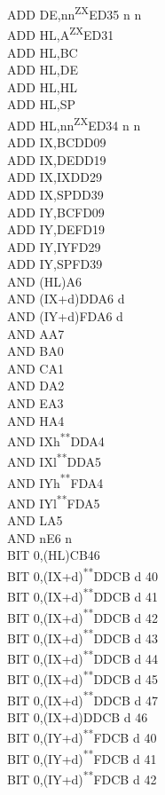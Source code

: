 \documentclass[twoside,openright,a4paper]{book}
\newcommand{\UNDOC}{\textnormal{\textsuperscript{**}}}
\newcommand{\ZXN}{\textnormal{\textsuperscript{ZX}}}
\begin{document}
\begin{multicols}{3}
{\begin{tabbing}
	ADD DE,nn\ZXN\>ED35 n n\\
	ADD HL,A\ZXN\>ED31\\
	ADD HL,BC\\
	ADD HL,DE\\
	ADD HL,HL\\
	ADD HL,SP\\
	ADD HL,nn\ZXN\>ED34 n n\\
	ADD IX,BC\>DD09\\
	ADD IX,DE\>DD19\\
	ADD IX,IX\>DD29\\
	ADD IX,SP\>DD39\\
	ADD IY,BC\>FD09\\
	ADD IY,DE\>FD19\\
	ADD IY,IY\>FD29\\
	ADD IY,SP\>FD39\\
	AND (HL)\>A6\\
	AND (IX+d)\>DDA6 d\\
	AND (IY+d)\>FDA6 d\\
	AND A\>A7\\
	AND B\>A0\\
	AND C\>A1\\
	AND D\>A2\\
	AND E\>A3\\
	AND H\>A4\\
	AND IXh\UNDOC\>DDA4\\
	AND IXl\UNDOC\>DDA5\\
	AND IYh\UNDOC\>FDA4\\
	AND IYl\UNDOC\>FDA5\\
	AND L\>A5\\
	AND n\>E6 n\\
	BIT 0,(HL)\>CB46\\
	BIT 0,(IX+d)\UNDOC\>DDCB d 40\\
	BIT 0,(IX+d)\UNDOC\>DDCB d 41\\
	BIT 0,(IX+d)\UNDOC\>DDCB d 42\\
	BIT 0,(IX+d)\UNDOC\>DDCB d 43\\
	BIT 0,(IX+d)\UNDOC\>DDCB d 44\\
	BIT 0,(IX+d)\UNDOC\>DDCB d 45\\
	BIT 0,(IX+d)\UNDOC\>DDCB d 47\\
	BIT 0,(IX+d)\>DDCB d 46\\
	BIT 0,(IY+d)\UNDOC\>FDCB d 40\\
	BIT 0,(IY+d)\UNDOC\>FDCB d 41\\
	BIT 0,(IY+d)\UNDOC\>FDCB d 42\\

\end{tabbing}}
\end{multicols}
\end{document}
